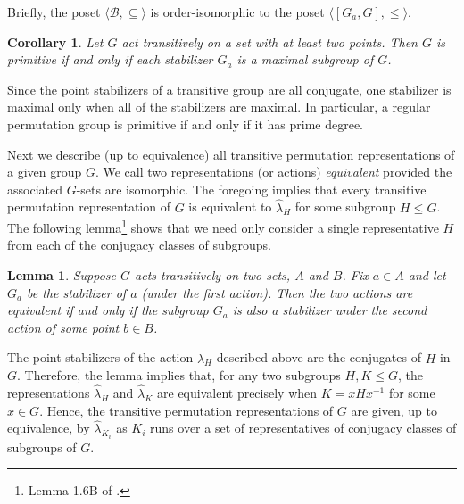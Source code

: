 \documentclass[cm,dissertation]{uhthesis}
\theoremstyle{plain}
\newtheorem{corollary}[theorem]{Corollary}
\newtheorem{lemma}[theorem]{Lemma}
\theoremstyle{definition}
\theoremstyle{remark}
\numberwithin{theorem}{section}
\numberwithin{claim}{chapter}
\numberwithin{equation}{section}
\numberwithin{conjecture}{chapter}
\newcommand{\<}{\ensuremath{\langle}}
\renewcommand{\>}{\ensuremath{\rangle}}
\renewcommand{\leq}{\ensuremath{\leqslant}}
\newcommand{\0}{\ensuremath{\mathbf{0}}}
\newcommand{\1}{\ensuremath{\mathbf{1}}}
\newcommand{\2}{\ensuremath{\mathbf{2}}}
\newcommand{\3}{\ensuremath{\mathbf{3}}}
\newcommand{\4}{\ensuremath{\mathbf{4}}}
\newcommand{\5}{\ensuremath{\mathbf{5}}}
\newcommand{\sB}{\ensuremath{\mathscr{B}}}
\newcommand{\hlambda}{\ensuremath{\hat{\lambda}}}
\newcommand{\stab}[1]{\ensuremath{G_{#1}}}
\begin{document}
  Briefly, the poset $\<\sB, \subseteq\>$ is order-isomorphic to the 
  poset $\<[\stab{a},G], \leq\>$. 

  \begin{corollary}
    Let $G$ act transitively on a set with at least two
    points. 
    Then $G$ is primitive if and only if each stabilizer $\stab{a}$ is a
    maximal subgroup of $G$.
  \end{corollary}

  Since the point stabilizers of a transitive group are all conjugate, 
  one stabilizer is maximal only when all of the stabilizers are maximal. 
  In particular, a regular permutation group is primitive if and only if it has
  prime degree. 

Next we describe (up to equivalence) all transitive permutation
representations of a given group $G$.  
We call two representations (or actions) 
%
\emph{equivalent}
provided the associated $G$-sets are isomorphic. 
The foregoing implies that every transitive permutation representation of $G$ is
equivalent to $\hlambda_H$ for some subgroup $H \leq G$.  The following
lemma\footnote{Lemma 1.6B of \cite{Dixon:1996}.} 
shows that we need only consider a single representative $H$ from each of the
conjugacy classes of subgroups.  

\begin{lemma}
  Suppose $G$ acts transitively on two sets,
  $A$ and $B$.  Fix $a\in A$ and let $G_a$ be the stabilizer of $a$ (under the first
  action).  Then the two actions are equivalent
  if and only if the subgroup $G_a$ is also a stabilizer under the second action
  of some point $b\in B$. 
\end{lemma}

The point stabilizers of the action $\hlambda_H$ described above are the
conjugates of $H$ in $G$.  Therefore, the lemma implies that, for any two
subgroups $H, K \leq G$, the representations $\hlambda_H$ and $\hlambda_K$ are
equivalent precisely when $K = x Hx^{-1}$ for some $x\in G$. 
Hence, the transitive permutation representations of $G$ are given, up to
equivalence, by $\hlambda_{K_i}$ as $K_i$ runs over a set of representatives of
conjugacy classes of subgroups of $G$.   
\end{document}
